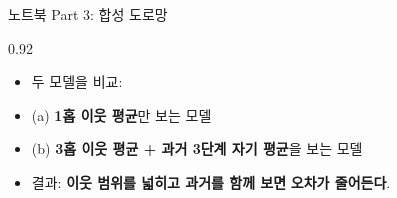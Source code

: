 \begin{frame}{노트북 Part 3: 합성 도로망}
\begin{center}\begin{varwidth}{0.92\textwidth}
  \begin{itemize}
    
    \item 두 모델을 비교:
    \item (a) \textbf{1홉 이웃 평균}만 보는 모델
    \item (b) \textbf{3홉 이웃 평균 + 과거 3단계 자기 평균}을
      보는 모델
    \item 결과: \textbf{이웃 범위를 넓히고 과거를 함께 보면}
      \textbf{오차가 줄어든다}.
  \end{itemize}
\end{varwidth}\end{center}
\end{frame}
